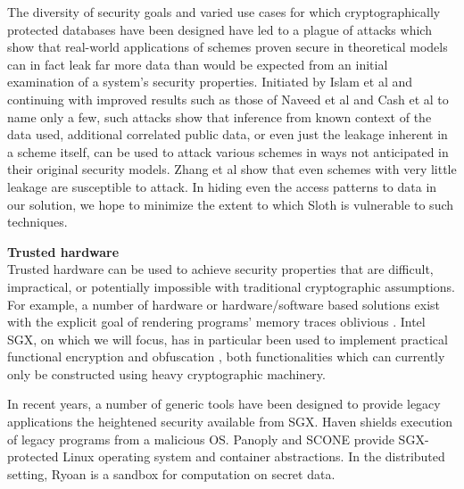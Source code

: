 \documentclass[USenglish,oneside,twocolumn]{article}
\def\name/{Sloth}
\begin{document}
The diversity of security goals and varied use cases for which cryptographically protected databases have been designed have led to a plague of attacks which show that real-world applications of schemes proven secure in theoretical models can in fact leak far more data than would be expected from an initial examination of a system's security properties. Initiated by Islam et al \cite{IKK12} and continuing with improved results such as those of Naveed et al \cite{NKW15} and Cash et al \cite{CGPR15} to name only a few, such attacks show that inference from known context of the data used, additional correlated public data, or even just the leakage inherent in a scheme itself, can be used to attack various schemes in ways not anticipated in their original security models. Zhang et al \cite{ZKP16} show that even schemes with very little leakage are susceptible to attack. In hiding even the access patterns to data in our solution, we hope to minimize the extent to which \name/ is vulnerable to such techniques.   

\medskip \noindent \textbf{Trusted hardware}\\
Trusted hardware can be used to achieve security properties that are difficult, impractical, or potentially impossible with traditional cryptographic assumptions. For example, a number of hardware or hardware/software based solutions exist with the explicit goal of rendering programs' memory traces oblivious \cite{CLD16, LHM+15, MLS+13}. Intel SGX, on which we will focus, has in particular been used to implement practical functional encryption \cite{FVBG16} and obfuscation \cite{NFR+17}, both functionalities which can currently only be constructed using heavy cryptographic machinery.

In recent years, a number of generic tools have been designed to provide legacy applications the heightened security available from SGX. Haven \cite{BPH15} shields execution of legacy programs from a malicious OS. Panoply and SCONE \cite{STTS17, ATG+16} provide SGX-protected Linux operating system and container abstractions. In the distributed setting, Ryoan \cite{HZX+16} is a sandbox for computation on secret data. 
\end{document}
